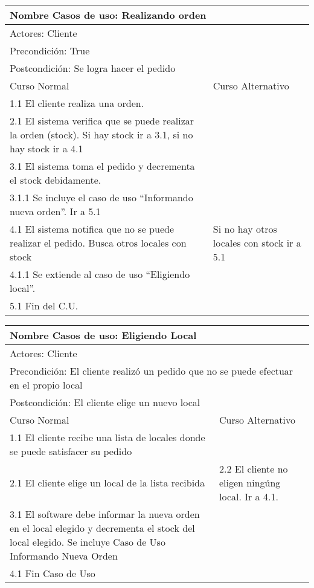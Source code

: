 \documentclass[a4paper,10pt]{article}
\begin{document}
\begin{center}
\begin{tabularx}{14cm}{|X|X|}
\hline
\multicolumn{2}{|l|}{Nombre Casos de uso: Realizando orden}\\
\hline
\multicolumn{2}{|l|}{Actores: Cliente}\\
\hline
\multicolumn{2}{|l|}{Precondici\'on: True}\\
\hline
\multicolumn{2}{|l|}{Postcondici\'on: Se logra hacer el pedido}\\
\hline
Curso Normal & Curso Alternativo\\
\hline
1.1 El cliente realiza una orden. & 
\\
\hline
2.1 El sistema verifica que se puede realizar la orden (stock). Si hay stock ir a 3.1, si no hay stock ir a 4.1&
\\
\hline
3.1 El sistema toma el pedido y decrementa el stock debidamente. &
\\
\hline
3.1.1 Se incluye el caso de uso ``Informando nueva orden''. Ir a 5.1 &
\\
\hline
4.1 El sistema notifica que no se puede realizar el pedido. Busca otros locales con stock & Si no hay otros locales con stock ir a 5.1
\\
\hline
4.1.1 Se extiende al caso de uso ``Eligiendo local''. &
\\
\hline
5.1 Fin del C.U. & \\
\hline
\end{tabularx}
\end{center}


\bigskip

\begin{center}
\begin{tabularx}{14cm}{|X|X|}
\hline
\multicolumn{2}{|l|}{Nombre Casos de uso: Eligiendo Local}\\
\hline
\multicolumn{2}{|l|}{Actores: Cliente}\\
\hline
\multicolumn{2}{|l|}{Precondici\'on: El cliente realiz\'o un pedido que no se puede efectuar en el propio local}\\
\hline
\multicolumn{2}{|l|}{Postcondici\'on: El cliente elige un nuevo local}\\
\hline
Curso Normal & Curso Alternativo\\
\hline
1.1 El cliente recibe una lista de locales donde se puede satisfacer su pedido & 
\\
\hline
2.1 El cliente elige un local de la lista recibida & 2.2 El cliente no eligen ning\'ung local. Ir a 4.1.
\\
\hline
3.1 El software debe informar la nueva orden en el local elegido y decrementa el stock del local elegido. Se incluye Caso de Uso Informando Nueva Orden &
\\
\hline
4.1 Fin Caso de Uso &
\\
\hline
\end{tabularx}
\end{center}
\end{document}
